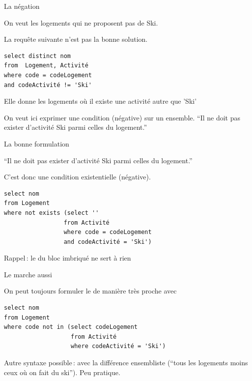 

\begin{frame}[fragile]{La négation}

On veut les logements qui ne proposent pas de Ski. 

\vfill
La requête
suivante n'est pas la bonne solution.

\vfill

\begin{verbatim}
select distinct nom
from  Logement, Activité
where code = codeLogement
and codeActivité != 'Ski'
\end{verbatim}

\vfill

Elle donne les logements où il existe une  activité autre que 'Ski'

\vfill

 On veut ici exprimer une condition (négative) 
sur un \alert{ensemble}. ``Il ne doit pas exister
d'activité Ski parmi celles du logement.''

\end{frame}

\begin{frame}[fragile]{La bonne formulation}

``Il ne doit pas exister
d'activité Ski parmi celles du logement.''
\vfill

C'est donc une condition existentielle (négative). 

\vfill

\begin{verbatim}
select nom
from Logement 
where not exists (select ''
                 from Activité 
                 where code = codeLogement
                 and codeActivité = 'Ski')
\end{verbatim}

\vfill

Rappel\,: le  du bloc imbriqué ne sert à rien
\end{frame}


\begin{frame}[fragile]{Le  marche aussi}

On peut toujours formuler le 
de manière très proche avec 
\vfill


\begin{verbatim}
select nom
from Logement
where code not in (select codeLogement
                   from Activité
                   where codeActivité = 'Ski')
\end{verbatim}

\vfill

Autre syntaxe possible\,: avec la différence ensembliste (``tous les logements moins
ceux où on fait du ski''). Peu pratique.
\end{frame}


